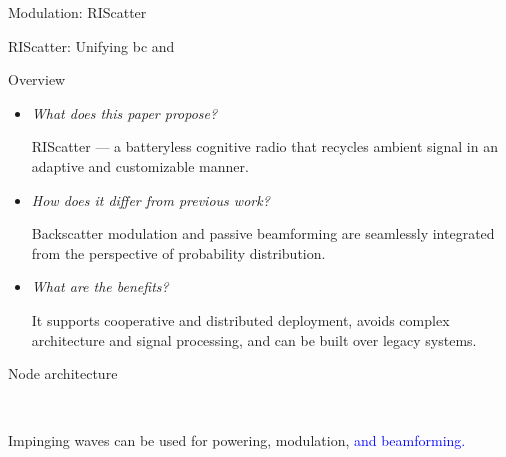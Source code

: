\documentclass[presentation,xcolor={table},9pt]{beamer}
\begin{document}
\begin{section}{Modulation: RIScatter}
	\begin{frame}{RIScatter: Unifying \gls{bc} and }
		\begin{block}{Overview}
			\begin{itemize}\setlength\itemsep{20pt}
				\item \textit{What does this paper propose?}

				RIScatter --- a batteryless cognitive radio that recycles ambient signal in an adaptive and customizable manner.
				\item \textit{How does it differ from previous work?}

				Backscatter modulation and passive beamforming are seamlessly integrated from the perspective of probability distribution.
				\item \textit{What are the benefits?}

				It supports cooperative and distributed deployment, avoids complex architecture and signal processing, and can be built over legacy systems.
			\end{itemize}
		\end{block}
	\end{frame}

	\begin{frame}{Node architecture}
		\vspace{-0.5cm}
		\begin{figure}
			\centering
			\\
		\end{figure}
		Impinging waves can be used for powering, modulation, \textcolor{blue}{and beamforming.}
	\end{frame}


\end{section}
\end{document}
